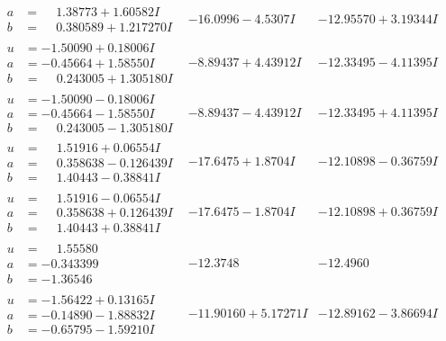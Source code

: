 \documentclass[1p]{elsarticle_modified}
\theoremstyle{definition}
\begin{document}
$$\begin{array}{c|c|c}
\begin{aligned}
a &= \phantom{-}1.38773 + 1.60582 I \\
b &= \phantom{-}0.380589 + 1.217270 I\end{aligned}
 & -16.0996 - 4.5307 I & -12.95570 + 3.19344 I \\ \hline\begin{aligned}
u &= -1.50090 + 0.18006 I \\
a &= -0.45664 + 1.58550 I \\
b &= \phantom{-}0.243005 + 1.305180 I\end{aligned}
 & -8.89437 + 4.43912 I & -12.33495 - 4.11395 I \\ \hline\begin{aligned}
u &= -1.50090 - 0.18006 I \\
a &= -0.45664 - 1.58550 I \\
b &= \phantom{-}0.243005 - 1.305180 I\end{aligned}
 & -8.89437 - 4.43912 I & -12.33495 + 4.11395 I \\ \hline\begin{aligned}
u &= \phantom{-}1.51916 + 0.06554 I \\
a &= \phantom{-}0.358638 - 0.126439 I \\
b &= \phantom{-}1.40443 - 0.38841 I\end{aligned}
 & -17.6475 + 1.8704 I & -12.10898 - 0.36759 I \\ \hline\begin{aligned}
u &= \phantom{-}1.51916 - 0.06554 I \\
a &= \phantom{-}0.358638 + 0.126439 I \\
b &= \phantom{-}1.40443 + 0.38841 I\end{aligned}
 & -17.6475 - 1.8704 I & -12.10898 + 0.36759 I \\ \hline\begin{aligned}
u &= \phantom{-}1.55580\phantom{ +0.000000I} \\
a &= -0.343399\phantom{ +0.000000I} \\
b &= -1.36546\phantom{ +0.000000I}\end{aligned}
 & -12.3748\phantom{ +0.000000I} & -12.4960\phantom{ +0.000000I} \\ \hline\begin{aligned}
u &= -1.56422 + 0.13165 I \\
a &= -0.14890 - 1.88832 I \\
b &= -0.65795 - 1.59210 I\end{aligned}
 & -11.90160 + 5.17271 I & -12.89162 - 3.86694 I \\ \hline\begin{aligned}

\end{aligned}
\end{array}$$
\end{document}
